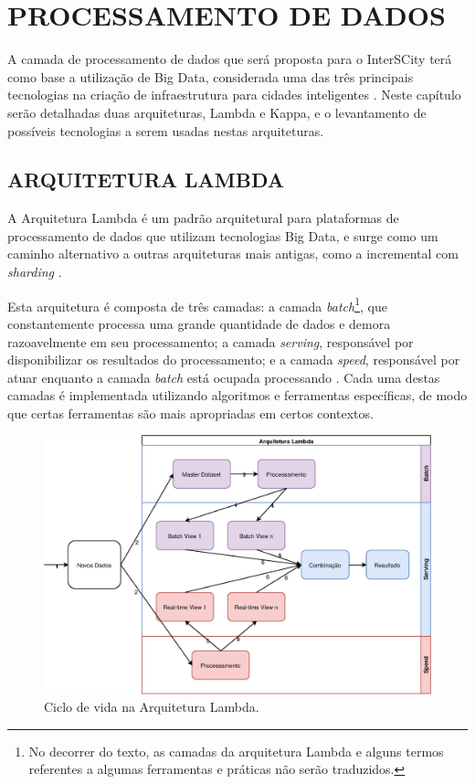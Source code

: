\chapter[PROCESSAMENTO DE DADOS]{PROCESSAMENTO DE DADOS}
\label{chapter:data}

A camada de processamento de dados que será proposta para o InterSCity terá
como base a utilização de Big Data, considerada uma das três principais
tecnologias na criação de infraestrutura para cidades inteligentes
\cite{kon2016}. Neste capítulo serão detalhadas duas arquiteturas, Lambda e
Kappa, e o levantamento de possíveis tecnologias a serem usadas nestas
arquiteturas.

\section{ARQUITETURA LAMBDA}

A Arquitetura Lambda é um padrão arquitetural para plataformas de processamento
de dados que utilizam tecnologias Big Data, e surge como um caminho alternativo a
outras arquiteturas mais antigas, como a incremental com \textit{sharding}
\cite{marz2015}.

Esta arquitetura é composta de três camadas: a camada
\textit{batch}\footnote{No decorrer do texto, as camadas da arquitetura Lambda e alguns
termos referentes a algumas ferramentas e práticas não serão traduzidos.}, que
constantemente processa uma grande quantidade de dados e demora razoavelmente
em seu processamento; a camada \textit{serving}, responsável por disponibilizar
os resultados do processamento; e a camada \textit{speed}, responsável por
atuar enquanto a camada \textit{batch} está ocupada processando
\cite{marz2015}. Cada uma destas camadas é implementada utilizando algoritmos e
ferramentas específicas, de modo que certas ferramentas são mais apropriadas em
certos contextos.

\begin{figure}
  \centering
    \includegraphics[width=\textwidth]{figuras/lambda-lifecycle.eps}
  \caption{Ciclo de vida na Arquitetura Lambda.}
  \label{fig:lambda-lifecycle}
\end{figure}

